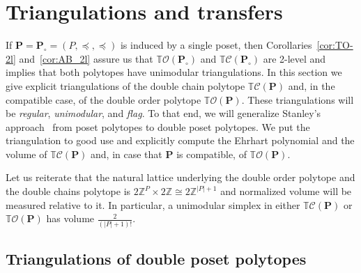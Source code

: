 \documentclass[11pt]{amsart}
\theoremstyle{definition}
\begin{document}
\section{Triangulations and transfers}
\label{sec:triang}

If ${\mathbf{P}} = {\mathbf{P}}_\circ =  ({P},\preceq,\preceq)$ is induced by a single poset, then
Corollaries~\ref{cor:TO-2l} and~\ref{cor:AB_2l} assure us that
${{\mathbb{T}}{\mathcal{O}({{{\mathbf{P}}_\circ}})}}$ and ${{\mathbb{T}}{\mathcal{C}({{{{\mathbf{P}}_\circ}}})}}$ are 2-level
and~\cite[Thm.~2.4]{Sullivant} implies that both polytopes have unimodular
triangulations.  In this section we give explicit triangulations of the double
chain polytope ${{\mathbb{T}}{\mathcal{C}({{{\mathbf{P}}}})}}$ and, in the compatible case, of the double order
polytope ${{\mathbb{T}}{\mathcal{O}({\mathbf{P}})}}$.  These triangulations will be \emph{regular},
\emph{unimodular}, and \emph{flag}.  To that end, we will generalize Stanley's
approach~\cite{TwoPoset} from poset polytopes to double poset polytopes.  We
put the triangulation to good use and explicitly compute the Ehrhart
polynomial and the volume of ${{\mathbb{T}}{\mathcal{C}({{{\mathbf{P}}}})}}$ and, in case that ${\mathbf{P}}$ is
compatible, of ${{\mathbb{T}}{\mathcal{O}({\mathbf{P}})}}$.

Let us reiterate that the natural lattice underlying the double order
polytope and the double chains polytope is $2{\mathbb{Z}}^{P} \times 2{\mathbb{Z}} \cong 2
{\mathbb{Z}}^{|{P}|+1}$ and normalized volume will be measured relative to it. In
particular, a unimodular simplex in either ${{\mathbb{T}}{\mathcal{C}({{{\mathbf{P}}}})}}$
or ${{\mathbb{T}}{\mathcal{O}({\mathbf{P}})}}$ has volume $\frac{2}{(|{P}|+1)!}$.

\subsection{Triangulations of double poset polytopes}
\label{ssec:TO_triang}
\end{document}
